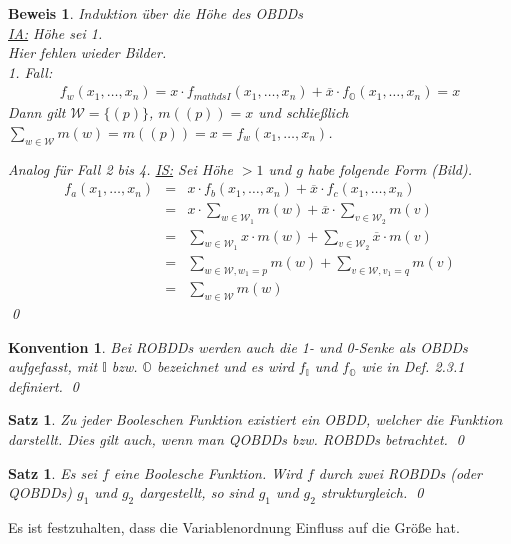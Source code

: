 \documentclass[ngerman]{scrartcl}
\theoremstyle{custom}
\newtheorem{ms}[mdef]{Satz}
\newtheorem*{bw}{Beweis}
\newtheorem{mk}[mdef]{Konvention}
\newcommand{\0}{\mathbf{0}}
\newcommand{\1}{\mathbf{L}}
\begin{document}
\begin{bw}
Induktion \"uber die H\"ohe des OBDDs\\
\underline{IA:} H\"ohe sei 1.\\
Hier fehlen wieder Bilder.\\
1. Fall: \\
\begin{eqnarray*}
f_w(x_1,\dots,x_n)= x \cdot f_{mathds{I}}(x_1,\dots,x_n) +
\overline{x} \cdot f_{\mathds{O}}(x_1,\dots,x_n) = x
\end{eqnarray*}
Dann gilt $\mathcal{W}=\{(p)\}$, $m((p)) = x$ und schlie\ss lich
$\sum_{w \in \mathcal{W}} m(w) = m((p))=x = f_w(x_1,\dots,x_n)$.

Analog f\"ur Fall 2 bis 4.
\underline{IS:} Sei H\"ohe $> 1$ und $g$ habe folgende Form (Bild).\\
\begin{eqnarray*}
f_a(x_1,\dots,x_n) &=& x \cdot f_b(x_1,\dots,x_n) + \overline{x} \cdot
f_c(x_1,\dots,x_n) \\
&=& x \cdot \sum_{w \in \mathcal{W}_1} m(w) + \overline{x} \cdot
\sum_{v \in \mathcal{W}_2} m(v) \\
&=& \sum_{w \in \mathcal{W}_1} x \cdot m(w) + \sum_{v \in
  \mathcal{W}_2} \overline{x} \cdot m(v) \\
&=& \sum_{w \in \mathcal{W}, w_1 = p} m(w) + \sum_{v \in
  \mathcal{W}, v_1 = q} m(v)\\
&=& \sum_{w \in \mathcal{W}} m(w)
\end{eqnarray*}
\qed
\end{bw}

\begin{mk}
Bei ROBDDs werden auch die 1- und 0-Senke als OBDDs aufgefasst, mit
$\mathds{I}$ bzw. $\mathds{O}$ bezeichnet und es wird $f_{\mathds{I}}$
und $f_{\mathds{O}}$ wie in Def. 2.3.1 definiert.
\qed
\end{mk}

\begin{ms}
Zu jeder Booleschen Funktion existiert ein OBDD, welcher die Funktion
darstellt. Dies gilt auch, wenn man QOBDDs bzw. ROBDDs betrachtet.
\qed
\end{ms}

\begin{ms}
Es sei $f$ eine Boolesche Funktion. Wird $f$ durch zwei ROBDDs (oder
QOBDDs) $g_1$ und $g_2$ dargestellt, so sind $g_1$ und $g_2$ strukturgleich.
\qed
\end{ms}

Es ist festzuhalten, dass die Variablenordnung Einfluss auf die
Gr\"o\ss e hat.
\end{document}
